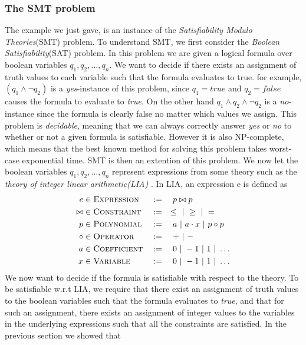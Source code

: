 	\subsubsection{The SMT problem}

	The example we just gave, is an instance of the \emph{Satisfiability Modulo Theories}(SMT) problem. To understand SMT, we first consider the \emph{Boolean Satisfiability}(SAT) problem. In this problem we are given a logical formula over boolean variables $q_1, q_2, \ldots, q_n$. We want to decide if there exists an assignment of truth values to each variable such that the formula evaluates to true. for example, $(q_1 \land \neg q_2)$ is a \emph{yes}-instance of this problem, since $q_1 = true$ and $q_2 = false$ causes the formula to evaluate to \emph{true}. On the other hand $q_1 \land q_2 \land \neg q_2$ is a \emph{no}-instance since the formula is clearly false no matter which values we assign. This problem is \emph{decidable}, meaning that we can always correctly answer \emph{yes} or \emph{no} to whether or not a given formula is satisfiable. However it is also NP-complete, which means that the best known method for solving this problem takes worst-case exponential time. SMT is then an extention of this problem. We now let the boolean variables $q_1, q_2, \ldots, q_n$ represent expressions from some theory such as the \emph{theory of integer linear arithmetic(LIA)} \cite{DeMoura2011}. In LIA, an expression e is defined as 
		\begin{alignat*}{3}
			e & \in \textsc{Expression} && := \quad p \bowtie p\\
			\bowtie & \in \textsc{Constraint} && := \quad \leq \ | \  \geq \ | \  =\\
			p & \in \textsc{Polynomial} && := \quad a \ | \  a\cdot x \ | \  p \circ p\\
			\circ & \in \textsc{Operator} && := \quad + \ | \  - \\
			a & \in \textsc{Coefficient} && := \quad 0 \ | \  -1 \ | \  1 \ | \  \ldots \\
			x & \in \textsc{Variable} && := \quad 0 \ | \  -1 \ | \  1 \ | \  \ldots		
		\end{alignat*} 
	We now want to decide if the formula is satisfiable with respect to the theory. To be satisfiable w.r.t LIA, we require that there exist an assignment of truth values to the boolean variables such that the formula evaluates to \emph{true}, and that for such an assignment, there exists an assignment of integer values to the variables in the underlying expressions such that all the constraints are satisfied. In the previous section we showed that 
	
